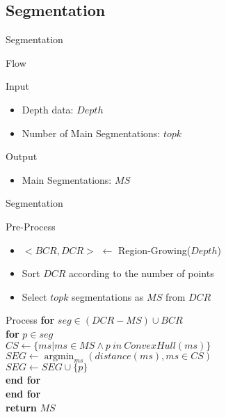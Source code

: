 \documentclass[xcolor=table,compress,blue]{beamer}
\begin{document}
\subsection{Segmentation}
\label{ALG-SEG}
\begin{frame}{Segmentation}
	\begin{exampleblock}{Flow}
	\end{exampleblock}
	\begin{exampleblock}{Input}
		\begin{itemize}		
			\item  Depth data: $Depth$
			\item  Number of Main Segmentations: ${topk}$
		\end{itemize}
	\end{exampleblock}
	\begin{exampleblock}{Output}
		\begin{itemize}		
			\item  Main Segmentations: ${MS}$
		\end{itemize}
	\end{exampleblock}
\end{frame}
\begin{frame}{Segmentation}
	\begin{exampleblock}{Pre-Process}
		\begin{itemize}
			\item $<BCR, DCR>$ $\leftarrow$ Region-Growing($Depth$)
			\item Sort $DCR$ according to the number of points
			\item Select $topk$ segmentations as $MS$ from $DCR$
		\end{itemize}
	\end{exampleblock}
	\begin{exampleblock}{Process}
		\textbf{for} {$seg \in  (DCR - MS) \cup BCR$}
		\\ \quad \textbf{for} {$p \in seg$}
		\\ \quad \quad $CS \leftarrow \{ms|ms \in MS \wedge p\ in\ ConvexHull(ms)\}$
		\\ \quad \quad $SEG \leftarrow \mathop{\arg\min}_{ms}(distance(ms), ms\in CS)$	
		\\ \quad \quad $SEG \leftarrow SEG \cup \{p\}$
	    \\ \quad \textbf{end for}
		\\ \textbf{end for} 
		\\ \textbf{return} $MS$
	\end{exampleblock}
\end{frame}
\end{document}

